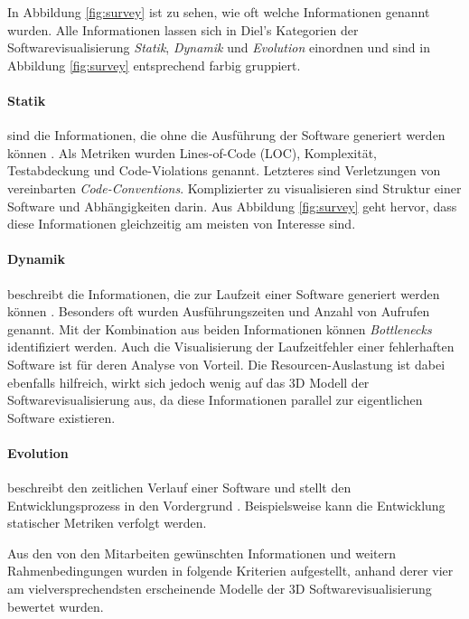 In Abbildung \ref{fig:survey} ist zu sehen, wie oft welche Informationen genannt wurden. Alle Informationen lassen sich in Diel's Kategorien der Softwarevisualisierung \cite{diehl2007software} \textit{Statik}, \textit{Dynamik} und \textit{Evolution} einordnen und sind in Abbildung \ref{fig:survey} entsprechend farbig gruppiert.

\paragraph{Statik} sind die Informationen, die ohne die Ausführung der Software generiert werden können \cite{diehl2007software}. Als Metriken wurden Lines-of-Code (LOC), Komplexität, Testabdeckung und Code-Violations genannt. Letzteres sind Verletzungen von vereinbarten \emph{Code-Conventions}. Komplizierter zu visualisieren sind Struktur einer Software und Abhängigkeiten darin. Aus Abbildung \ref{fig:survey} geht hervor, dass diese Informationen gleichzeitig am meisten von Interesse sind.

\paragraph{Dynamik} beschreibt die Informationen, die zur Laufzeit einer Software generiert werden können \cite{diehl2007software}. Besonders oft wurden Ausführungszeiten und Anzahl von Aufrufen genannt. Mit der Kombination aus beiden Informationen können \emph{Bottlenecks} identifiziert werden. Auch die Visualisierung der Laufzeitfehler einer fehlerhaften Software ist für deren Analyse von Vorteil. Die Resourcen-Auslastung ist dabei ebenfalls hilfreich, wirkt sich jedoch wenig auf das 3D Modell der Softwarevisualisierung aus, da diese Informationen parallel zur eigentlichen Software existieren.

\paragraph{Evolution} beschreibt den zeitlichen Verlauf einer Software und stellt den Entwicklungsprozess in den Vordergrund \cite{diehl2007software}. Beispielsweise kann die Entwicklung statischer Metriken verfolgt werden.

Aus den von den Mitarbeiten gewünschten Informationen und weitern Rahmenbedingungen wurden in \cite{puetz2017softwarevisualisierung} folgende Kriterien aufgestellt, anhand derer vier am vielversprechendsten erscheinende Modelle der 3D Softwarevisualisierung bewertet wurden.

